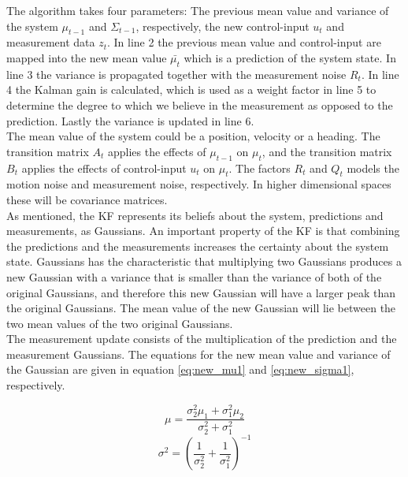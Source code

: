 The algorithm takes four parameters: The previous mean value and variance of the system $\mu_{t-1}$ and $\Sigma_{t-1}$, respectively, the new control-input $u_{t}$ and measurement data $z_{t}$. In line 2 the previous mean value and control-input are mapped into the new mean value $\bar{\mu_{t}}$ which is a prediction of the system state. In line 3 the variance is propagated together with the measurement noise $R_{t}$. In line 4 the Kalman gain is calculated, which is used as a weight factor in line 5 to determine the degree to which we believe in the measurement as opposed to the prediction. Lastly the variance is updated in line 6.\\

The mean value of the system could be a position, velocity or a heading. The transition matrix $A_{t}$ applies the effects of $\mu_{t-1}$ on $\mu_{t}$, and the transition matrix $B_{t}$ applies the effects of control-input $u_{t}$ on $\mu_{t}$. The factors $R_{t}$ and $Q_{t}$ models the motion noise and measurement noise, respectively. In higher dimensional spaces these will be covariance matrices.\\

As mentioned, the KF represents its beliefs about the system, predictions and measurements, as Gaussians. An important property of the KF is that combining the predictions and the measurements increases the certainty about the system state. Gaussians has the characteristic that multiplying two Gaussians produces a new Gaussian with a variance that is smaller than the variance of both of the original Gaussians, and therefore this new Gaussian will have a larger peak than the original Gaussians. The mean value of the new Gaussian will lie between the two mean values of the two original Gaussians. \\

The measurement update consists of the multiplication of the prediction and the measurement Gaussians. The equations for the new mean value and variance of the Gaussian are given in equation \ref{eq:new_mu1} and \ref{eq:new_sigma1}, respectively.

\begin{equation}
\label{eq:new_mu1}
\mu = \dfrac{\sigma_{2}^2\mu_{1} + \sigma_{1}^2\mu_{2}}{\sigma_{2}^2 + \sigma_{1}^2}
\end{equation}
\begin{equation}
\label{eq:new_sigma1}
\sigma^2 = (\dfrac{1}{\sigma_{2}^2} + \dfrac{1}{\sigma_{1}^2})^{-1}
\end{equation}

